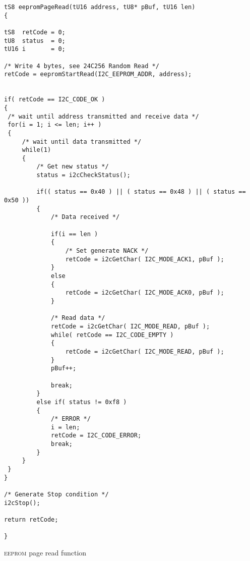 \documentclass[10pt]{article}
\begin{document}
\begin{program}[h]
    \begin{lstlisting}
tS8 eepromPageRead(tU16 address, tU8* pBuf, tU16 len)
{

tS8  retCode = 0;
tU8  status  = 0;
tU16 i       = 0;

/* Write 4 bytes, see 24C256 Random Read */
retCode = eepromStartRead(I2C_EEPROM_ADDR, address);


if( retCode == I2C_CODE_OK )
{
 /* wait until address transmitted and receive data */
 for(i = 1; i <= len; i++ )
 {
     /* wait until data transmitted */
     while(1)
     {
         /* Get new status */
         status = i2cCheckStatus();

         if(( status == 0x40 ) || ( status == 0x48 ) || ( status == 0x50 ))
         {
             /* Data received */

             if(i == len )
             {
                 /* Set generate NACK */
                 retCode = i2cGetChar( I2C_MODE_ACK1, pBuf );
             }
             else
             {
                 retCode = i2cGetChar( I2C_MODE_ACK0, pBuf );
             }

             /* Read data */
             retCode = i2cGetChar( I2C_MODE_READ, pBuf );
             while( retCode == I2C_CODE_EMPTY )
             {
                 retCode = i2cGetChar( I2C_MODE_READ, pBuf );
             }
             pBuf++;

             break;
         }
         else if( status != 0xf8 )
         {
             /* ERROR */
             i = len;
             retCode = I2C_CODE_ERROR;
             break;
         }
     }
 }
}

/* Generate Stop condition */
i2cStop();

return retCode;

}
    \end{lstlisting}
    \caption{\textsc{eeprom} page read function}
\end{program}
\end{document}
